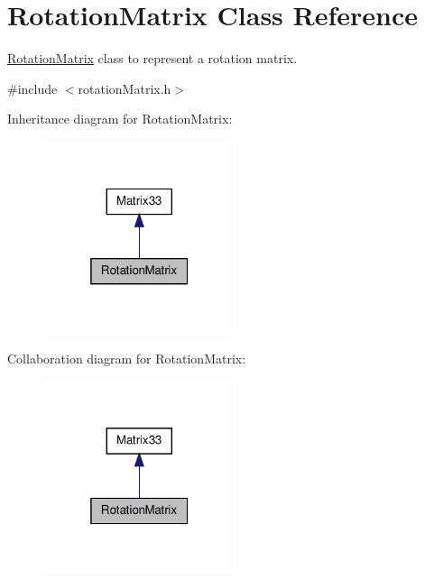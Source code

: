 \hypertarget{classRotationMatrix}{\section{\-Rotation\-Matrix \-Class \-Reference}
\label{d2/d4a/classRotationMatrix}
}


\hyperlink{classRotationMatrix}{\-Rotation\-Matrix} class to represent a rotation matrix.  




{\ttfamily \#include $<$rotation\-Matrix.\-h$>$}



\-Inheritance diagram for \-Rotation\-Matrix\-:\nopagebreak
\begin{figure}[H]
\begin{center}
\leavevmode
\includegraphics[width=160pt]{d5/d4d/classRotationMatrix__inherit__graph}
\end{center}
\end{figure}


\-Collaboration diagram for \-Rotation\-Matrix\-:\nopagebreak
\begin{figure}[H]
\begin{center}
\leavevmode
\includegraphics[width=160pt]{d5/dc0/classRotationMatrix__coll__graph}
\end{center}
\end{figure}
